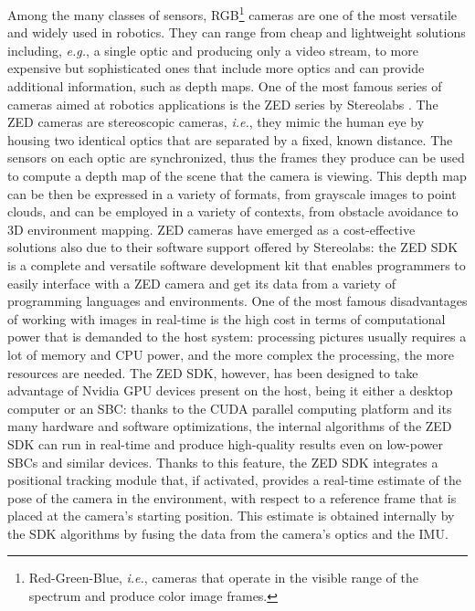 Among the many classes of sensors, RGB\footnote{Red-Green-Blue, \emph{i.e.}, cameras that operate in the visible range of the spectrum and produce color image frames.} cameras are one of the most versatile and widely used in robotics. They can range from cheap and lightweight solutions including, \emph{e.g.}, a single optic and producing only a video stream, to more expensive but sophisticated ones that include more optics and can provide additional information, such as depth maps. One of the most famous series of cameras aimed at robotics applications is the ZED series by Stereolabs \cite{stereolabs_stereolabs_nodate}. The ZED cameras are stereoscopic cameras, \emph{i.e.}, they mimic the human eye by housing two identical optics that are separated by a fixed, known distance. The sensors on each optic are synchronized, thus the frames they produce can be used to compute a depth map of the scene that the camera is viewing. This depth map can be then be expressed in a variety of formats, from grayscale images to point clouds, and can be employed in a variety of contexts, from obstacle avoidance to 3D environment mapping. ZED cameras have emerged as a cost-effective solutions also due to their software support offered by Stereolabs: the ZED SDK \cite{stereolabs_zed_nodate} is a complete and versatile software development kit that enables programmers to easily interface with a ZED camera and get its data from a variety of programming languages and environments. One of the most famous disadvantages of working with images in real-time is the high cost in terms of computational power that is demanded to the host system: processing pictures usually requires a lot of memory and CPU power, and the more complex the processing, the more resources are needed. The ZED SDK, however, has been designed to take advantage of Nvidia GPU devices present on the host, being it either a desktop computer or an SBC: thanks to the CUDA parallel computing platform and its many hardware and software optimizations, the internal algorithms of the ZED SDK can run in real-time and produce high-quality results even on low-power SBCs and similar devices. Thanks to this feature, the ZED SDK integrates a positional tracking module that, if activated, provides a real-time estimate of the pose of the camera in the environment, with respect to a reference frame that is placed at the camera's starting position. This estimate is obtained internally by the SDK algorithms by fusing the data from the camera's optics and the IMU.

